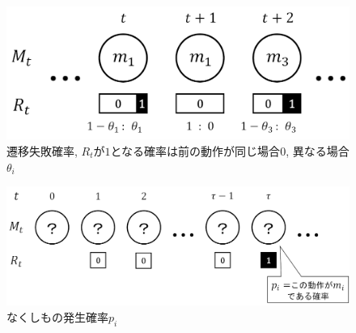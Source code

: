 \begin{figure}[H]
    \begin{center}
    \includegraphics[width=0.8\linewidth]{figs/miss_prob.png}
    \caption{遷移失敗確率, $R_t$が$1$となる確率は前の動作が同じ場合$0$, 異なる場合$\theta_i$}
    \label{fig:r}
    \end{center}
\end{figure}

\begin{figure}[H]
    \begin{center}
    \includegraphics[width=1.0\linewidth]{figs/lost_prob.png}
    \caption{なくしもの発生確率$p_i$}
    \label{fig:p}
    \end{center}
\end{figure}

